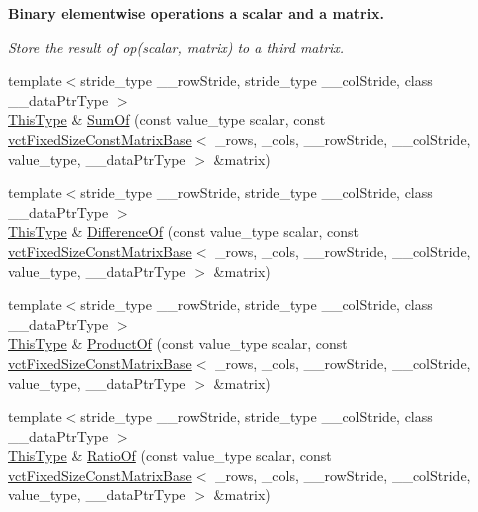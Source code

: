 \begin{Indent}{\bf Binary elementwise operations a scalar and a matrix.}\par
{\em Store the result of op(scalar, matrix) to a third matrix. }\begin{DoxyCompactItemize}
\item 
{\footnotesize template$<$stride\+\_\+type \+\_\+\+\_\+row\+Stride, stride\+\_\+type \+\_\+\+\_\+col\+Stride, class \+\_\+\+\_\+data\+Ptr\+Type $>$ }\\\hyperlink{classvct_fixed_size_const_matrix_base_a7ec66a96ed7e08ce9ff54093133c9d8d}{This\+Type} \& \hyperlink{classvct_fixed_size_matrix_base_afad329402953580776ff2c72254edc61}{Sum\+Of} (const value\+\_\+type scalar, const \hyperlink{classvct_fixed_size_const_matrix_base}{vct\+Fixed\+Size\+Const\+Matrix\+Base}$<$ \+\_\+rows, \+\_\+cols, \+\_\+\+\_\+row\+Stride, \+\_\+\+\_\+col\+Stride, value\+\_\+type, \+\_\+\+\_\+data\+Ptr\+Type $>$ \&matrix)
\item 
{\footnotesize template$<$stride\+\_\+type \+\_\+\+\_\+row\+Stride, stride\+\_\+type \+\_\+\+\_\+col\+Stride, class \+\_\+\+\_\+data\+Ptr\+Type $>$ }\\\hyperlink{classvct_fixed_size_const_matrix_base_a7ec66a96ed7e08ce9ff54093133c9d8d}{This\+Type} \& \hyperlink{classvct_fixed_size_matrix_base_a53bdb7c0294f40c67f4338bdb05ecf93}{Difference\+Of} (const value\+\_\+type scalar, const \hyperlink{classvct_fixed_size_const_matrix_base}{vct\+Fixed\+Size\+Const\+Matrix\+Base}$<$ \+\_\+rows, \+\_\+cols, \+\_\+\+\_\+row\+Stride, \+\_\+\+\_\+col\+Stride, value\+\_\+type, \+\_\+\+\_\+data\+Ptr\+Type $>$ \&matrix)
\item 
{\footnotesize template$<$stride\+\_\+type \+\_\+\+\_\+row\+Stride, stride\+\_\+type \+\_\+\+\_\+col\+Stride, class \+\_\+\+\_\+data\+Ptr\+Type $>$ }\\\hyperlink{classvct_fixed_size_const_matrix_base_a7ec66a96ed7e08ce9ff54093133c9d8d}{This\+Type} \& \hyperlink{classvct_fixed_size_matrix_base_a5ba858bd9d276410c41e4e43fbf0eea5}{Product\+Of} (const value\+\_\+type scalar, const \hyperlink{classvct_fixed_size_const_matrix_base}{vct\+Fixed\+Size\+Const\+Matrix\+Base}$<$ \+\_\+rows, \+\_\+cols, \+\_\+\+\_\+row\+Stride, \+\_\+\+\_\+col\+Stride, value\+\_\+type, \+\_\+\+\_\+data\+Ptr\+Type $>$ \&matrix)
\item 
{\footnotesize template$<$stride\+\_\+type \+\_\+\+\_\+row\+Stride, stride\+\_\+type \+\_\+\+\_\+col\+Stride, class \+\_\+\+\_\+data\+Ptr\+Type $>$ }\\\hyperlink{classvct_fixed_size_const_matrix_base_a7ec66a96ed7e08ce9ff54093133c9d8d}{This\+Type} \& \hyperlink{classvct_fixed_size_matrix_base_a313f0b9eb1c0a5169439eac63a9a0bee}{Ratio\+Of} (const value\+\_\+type scalar, const \hyperlink{classvct_fixed_size_const_matrix_base}{vct\+Fixed\+Size\+Const\+Matrix\+Base}$<$ \+\_\+rows, \+\_\+cols, \+\_\+\+\_\+row\+Stride, \+\_\+\+\_\+col\+Stride, value\+\_\+type, \+\_\+\+\_\+data\+Ptr\+Type $>$ \&matrix)

\end{DoxyCompactItemize}
\end{Indent}
